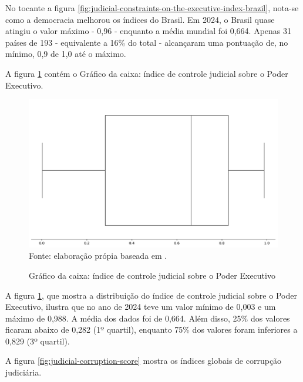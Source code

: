 No tocante a figura \ref{fig:judicial-constraints-on-the-executive-index-brazil}, nota-se como a democracia melhorou os índices do Brasil. Em 2024, o Brasil quase atingiu o valor máximo - 0,96 - enquanto a média mundial foi 0,664. Apenas 31 países de 193 - equivalente a 16\% do total - alcançaram uma pontuação de, no mínimo, 0,9 de 1,0 até o máximo.

A figura \ref{fig:quartis_controle_jus_sobre_gov} contém o Gráfico da caixa: índice de controle judicial sobre o Poder Executivo.

\begin{figure}[H]
    \centering
    \caption{Gráfico da caixa: índice de controle judicial sobre o Poder Executivo}
    \includegraphics[width=1\linewidth]{figuras/quartis_controle_jus_sobre_gov.png}
    \label{fig:quartis_controle_jus_sobre_gov}
    \footnotesize{Fonte: elaboração própia baseada em \cite{jus_constraints_on_gov}.}
\end{figure}

A figura \ref{fig:quartis_controle_jus_sobre_gov}, que mostra a distribuição do índice de controle judicial sobre o Poder Executivo, ilustra que no ano de 2024 teve um valor mínimo de 0,003 e um máximo de 0,988. A média dos dados foi de 0,664. Além disso, 25\% dos valores ficaram abaixo de 0,282 (1º quartil), enquanto 75\% dos valores foram inferiores a 0,829 (3º quartil).

A figura \ref{fig:judicial-corruption-score} mostra os índices globais de corrupção judiciária.

